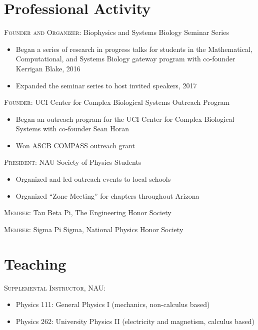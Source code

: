 \documentclass[letterpaper,10pt]{article} %
\begin{document}

\section*{Professional Activity}

\textsc{Founder and Organizer:} Biophysics and Systems Biology Seminar Series
\begin{itemize}
\item Began a series of research in progress talks for students in the Mathematical, Computational, and Systems Biology gateway program with co-founder Kerrigan Blake, 2016
\item Expanded the seminar series to host invited speakers, 2017
\end{itemize}

\textsc{Founder:} UCI Center for Complex Biological Systems Outreach Program
\begin{itemize}
\item Began an outreach program for the UCI Center for Complex Biological Systems with co-founder Sean Horan
\item Won ASCB COMPASS outreach grant
\end{itemize}

\textsc{President:} NAU Society of Physics Students
\begin{itemize}
\item Organized and led outreach events to local schools
\item Organized ``Zone Meeting'' for chapters throughout Arizona
\end{itemize}

\textsc{Member:} Tau Beta Pi, The Engineering Honor Society

\textsc{Member:} Sigma Pi Sigma, National Physics Honor Society


\section*{Teaching}

\textsc{Supplemental Instructor, NAU:}
\begin{itemize}
\item Physics 111: General Physics I (mechanics, non-calculus based)
\item Physics 262: University Physics II (electricity and magnetism, calculus based)
\end{itemize}
\end{document}
